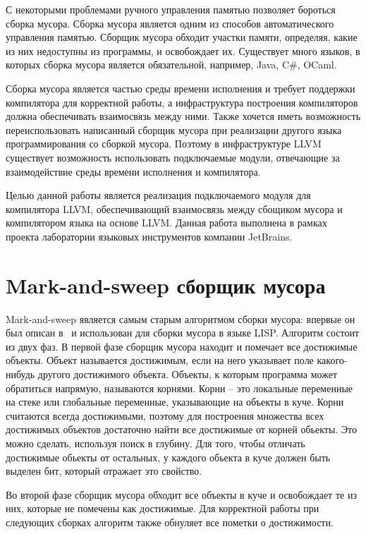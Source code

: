 С некоторыми проблемами ручного управления памятью позволяет бороться сборка мусора. 
Сборка мусора является одним из способов автоматического управления памятью. Сборщик мусора обходит участки памяти, определяя, 
какие из них недоступны из программы, и освобождает их. Существует много языков, в которых сборка мусора является обязательной,
например, Java, C\#, OCaml. 

Сборка мусора является частью среды времени исполнения и требует поддержки компилятора для корректной работы, а инфраструктура построения компиляторов должна обеспечивать взаимосвязь между ними. Также хочется иметь возможность переиспользовать написанный сборщик мусора при реализации другого языка программирования со сборкой мусора. Поэтому в инфраструктуре LLVM  существует возможность использовать подключаемые модули, отвечающие за взаимодействие среды времени исполнения и компилятора. 

Целью данной работы является реализация подключаемого модуля для компилятора LLVM, обеспечивающий взаимосвязь между 
сбощиком мусора и компилятором языка на основе LLVM.
Данная работа выполнена в рамках проекта лаборатории языковых инструментов компании JetBrains.

\section{Mark-and-sweep сборщик мусора}
Mark-and-sweep является самым старым алгоритмом сборки мусора: впервые он был описан в~\cite{lisp} и использован для сборки мусора в языке LISP. 
Алгоритм состоит из двух фаз. В первой фазе сборщик мусора находит и помечает все достижимые объекты. Объект называется достижимым, если на него указывает поле какого-нибудь другого достижимого объекта. Объекты, к которым программа может обратиться напрямую, называются корнями. Корни -- это локальные переменные на стеке или глобальные переменные, указывающие на объекты в куче. Корни считаются всегда достижимыми, поэтому для построения множества всех достижимых объектов достаточно найти все достижимые от корней обьекты. Это можно сделать, используя поиск в глубину. Для того, чтобы отличать достижимые обьекты от остальных, у каждого обьекта в куче должен быть выделен бит, который отражает это свойство.

Во второй фазе сборщик мусора обходит все объекты в куче и освобождает те из них, которые не помечены как достижимые. Для корректной работы при следующих сборках алгоритм также обнуляет все пометки о достижимости. 

